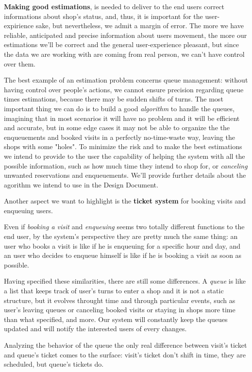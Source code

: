 \textbf{Making good estimations}, is needed to deliver to the end users correct informations about shop's status, and, thus, it is important for the user-expirience sake, but nevertheless, we admit a margin of error. The more we have reliable, anticipated and precise information about users movement, the more our estimations we'll be correct and the general user-experience pleasant, but since the data we are working with are coming from real person, we can't have control over them. 

The best example of an estimation problem concerns queue management: without having control over people's actions, we cannot ensure precision regarding queue times estimations, because there may be sudden shifts of turns. The most important thing we can do is to build a good \textit{algorithm} to handle the queues, imagining that in most scenarios it will have no problem and it will be efficient and accurate, but in some edge cases it may not be able to organize the the enqueuements and booked visits in a perfectly no-time-waste way, leaving the shops with some "holes". To minimize the risk and to make the best estimations we intend to provide to the user the capability of helping the system with all the possible information, such as how much time they intend to shop for, or \textit{canceling} unwanted reservations and enqueuements. We'll provide further details about the agorithm we intend to use in the Design Document.

Another aspect we want to highlight is the \textbf{ticket system} for booking visits and enqueuing users.

Even if \textit{booking a visit} and \textit{enqueuing} seems two totally different functions to the end user, by the system's perspective they are pretty much the same thing: an user who books a visit is like if he is enqueuing for a specific hour and day, and an user who decides to enqueue himself is like if he is booking a visit as soon as possible. 

Having specified these similarities, there are still some differences. A \textit{queue} is like a list that keeps track of user's turns to enter a shop and it is not a static structure, but it evolves throught time and through particular events, such as user's leaving queues or canceling booked visits or staying in shops more time than what specified, and more. Our system will constantly keep the queues updated and will notify the interested users of every changes. 

Analyzing the behavior of the queue the only real difference between visit's ticket and queue's ticket comes to the surface: visit's ticket don't shift in time, they are scheduled, but queue's tickets do.

